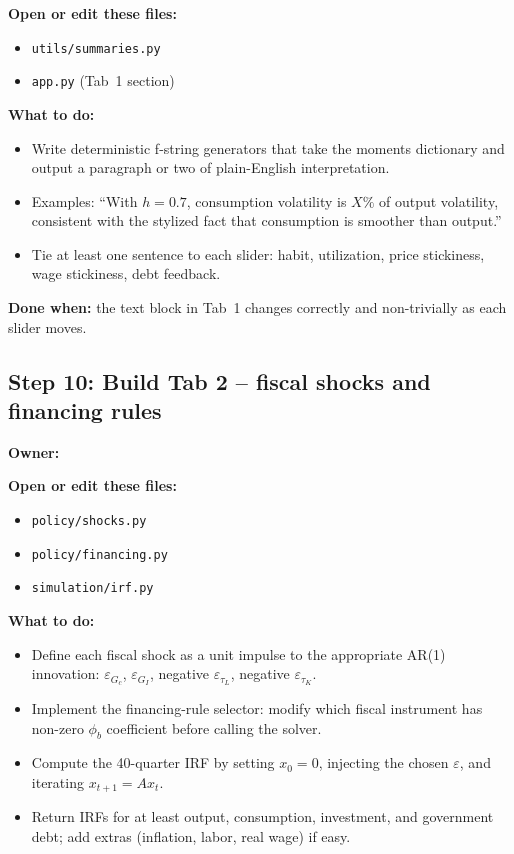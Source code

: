 \documentclass[11pt]{article}
\newcommand{\nameblank}{\underline{\hspace{4.5cm}}}
\begin{document}
\textbf{Open or edit these files:}
\begin{itemize}
    \item \texttt{utils/summaries.py}
    \item \texttt{app.py} (Tab~1 section)
\end{itemize}

\textbf{What to do:}
\begin{itemize}
    \item Write deterministic f-string generators that take the moments dictionary and output a paragraph or two of plain-English interpretation.
    \item Examples: ``With $h=0.7$, consumption volatility is $X\%$ of output volatility, consistent with the stylized fact that consumption is smoother than output.''
    \item Tie at least one sentence to each slider: habit, utilization, price stickiness, wage stickiness, debt feedback.
\end{itemize}

\textbf{Done when:} the text block in Tab~1 changes correctly and non-trivially as each slider moves.

\subsection{Step 10: Build Tab 2 -- fiscal shocks and financing rules}
\textbf{Owner:} \nameblank

\textbf{Open or edit these files:}
\begin{itemize}
    \item \texttt{policy/shocks.py}
    \item \texttt{policy/financing.py}
    \item \texttt{simulation/irf.py}
\end{itemize}

\textbf{What to do:}
\begin{itemize}
    \item Define each fiscal shock as a unit impulse to the appropriate AR(1) innovation: $\varepsilon_{G_c}$, $\varepsilon_{G_I}$, negative $\varepsilon_{\tau_L}$, negative $\varepsilon_{\tau_K}$.
    \item Implement the financing-rule selector: modify which fiscal instrument has non-zero $\phi_b$ coefficient before calling the solver.
    \item Compute the 40-quarter IRF by setting $x_0=0$, injecting the chosen $\varepsilon$, and iterating $x_{t+1}=A x_t$.
    \item Return IRFs for at least output, consumption, investment, and government debt; add extras (inflation, labor, real wage) if easy.
\end{itemize}
\end{document}
